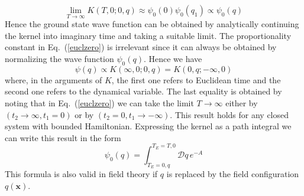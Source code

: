 \documentclass[12pt]{iopart}
\def\eq#1{{Eq.~(\ref{#1})}}
\begin{document}
\begin{equation}
\lim_{T\to\infty} K(T,0;  0,q)\approx
\psi_0(0)\psi_0(q_1)\propto \psi_0(q)
\label{euclzero}
\end{equation}
Hence the ground state wave function can be obtained
by analytically continuing the kernel into imaginary time and
taking a suitable limit. The proportionality constant in \eq{euclzero} is irrelevant since it can
always be obtained by normalizing the wave function $\psi_0(q)$. Hence we have
\begin{equation}
  \psi(q) \propto K(\infty,0; 0,q) = K(0,q;-\infty,0)
  \label{twoways}
 \end{equation} 
 where, in the arguments of $K$, the first one refers to Euclidean time and the second one refers to the dynamical variable. The last equality is obtained by noting that in
 \eq{euclzero} we can take the limit $T\to \infty$ either by $(t_2\to \infty, t_1=0)$
 or by $(t_2 = 0, t_1 \to -\infty)$. 
This result holds for any closed system with bounded Hamiltonian. 
Expressing the kernel as a path integral we can write this result in the form
\begin{equation}
 \psi_0(q) = \int_{T_E=0,q}^{T_E=T,0} \mathcal{D}q\, e^{-A} 
 \label{gsfrpi}
\end{equation} 
This formula is also valid in field theory if $q$ is replaced by the field configuration $q(\mathbf{x})$. 
\end{document}
